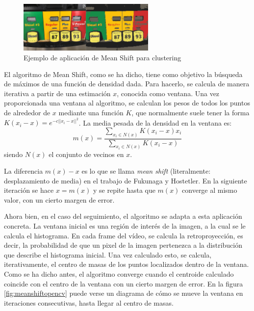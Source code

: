 \begin{figure}
    \centering
    \includegraphics[width=0.6\textwidth]{images/clustering}
    \caption{Ejemplo de aplicación de Mean Shift para clustering}
    \label{fig:clustering}
\end{figure}

El algoritmo de Mean Shift, como se ha dicho, tiene como objetivo la búsqueda de máximos de una función de densidad dada. Para hacerlo, se calcula de manera iterativa a partir de una estimación $x$, conocida como ventana. Una vez proporcionada una ventana al algoritmo, se calculan los pesos de todos los puntos de alrededor de $x$ mediante una función $K$, que normalmente suele tener la forma $K(x_i-x) = e^{-c||x_i-x||^2}$. La media pesada de la densidad en la ventana es:
\[
  m(x) = \frac{\sum_{x_i\in N(x)}K(x_i-x)x_i}{\sum_{x_i\in N(x)}K(x_i-x)}
\]
siendo $N(x)$ el conjunto de vecinos en $x$.

La diferencia $m(x)-x$ es lo que se llama \textit{mean shift} (literalmente: desplazamiento de media) en el trabajo de Fukunaga y Hostetler. En la siguiente iteración se hace $x= m(x)$ y se repite hasta que $m(x)$ converge al mismo valor, con un cierto margen de error.

Ahora bien, en el caso del seguimiento, el algoritmo se adapta a esta aplicación concreta. La ventana inicial es una región de interés de la imagen, a la cual se le calcula el histograma. En cada frame del vídeo, se calcula la retroproyección, es decir, la probabilidad de que un pixel de la imagen pertenezca a la distribución que describe el histograma inicial. Una vez calculado esto, se calcula, iterativamente, el centro de masas de los puntos localizados dentro de la ventana. Como se ha dicho antes, el algoritmo converge cuando el centroide calculado coincide con el centro de la ventana con un cierto margen de error. En la figura \ref{fig:meanshiftopencv} puede verse un diagrama de cómo se mueve la ventana en iteraciones consecutivas, hasta llegar al centro de masas.

